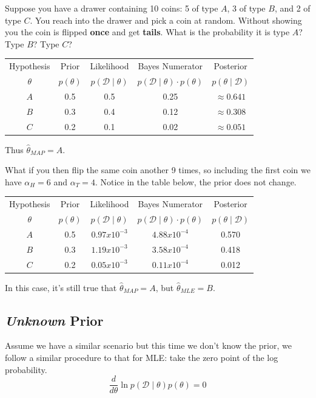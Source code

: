Suppose you have a drawer containing 10 coins: 
5 of type $A$, 3 of type $B$, and 2 of type $C$. 
You reach into the drawer and pick a coin at random. 
Without showing you the coin is flipped \textbf{once} and get \textbf{tails}. 
What is the probability it is type $A$? Type $B$? Type $C$? 

\begin{center}
\begin{tabular}{|c||c|c|c|c|}
\hline
Hypothesis & Prior & Likelihood & Bayes Numerator & Posterior\\
$\theta$ & $p(\theta)$ & $p(\mathcal{D}\mid\theta)$ & $p(\mathcal{D}\mid\theta)\cdot p(\theta)$ & $p(\theta\mid\mathcal{D})$\\
\hline
\hline
$A$	& 0.5		& 0.5		& 0.25	& $\approx0.641$\\
$B$	& 0.3		& 0.4		& 0.12	& $\approx0.308$\\
$C$	& 0.2		& 0.1		& 0.02	& $\approx0.051$\\
\hline
\end{tabular}
\end{center}

Thus $\hat\theta_{MAP} = A$. 

What if you then flip the same coin another 9 times, so including the first coin we have 
$\alpha_H=6$ and $\alpha_T=4$.
Notice in the table below, the prior does not change. 

\begin{center}
\begin{tabular}{|c||c|c|c|c|}
\hline
Hypothesis & Prior & Likelihood & Bayes Numerator & Posterior\\
$\theta$ & $p(\theta)$ & $p(\mathcal{D}\mid\theta)$ & $p(\mathcal{D}\mid\theta)\cdot p(\theta)$ & $p(\theta\mid\mathcal{D})$\\
\hline
\hline
$A$	& 0.5		& $0.97x10^{-3}$ & $4.88x10^{-4}$	& 0.570\\
$B$	& 0.3		& $1.19x10^{-3}$ & $3.58x10^{-4}$	& 0.418\\
$C$	& 0.2		& $0.05x10^{-3}$ & $0.11x10^{-4}$	& 0.012\\
\hline
\end{tabular}
\end{center}

In this case, it's still true that $\hat\theta_{MAP} = A$,
but $\hat\theta_{MLE} = B$. 


\subsection{\textit{Unknown} Prior}
Assume we have a similar scenario but this time we don't know the prior, 
we follow a similar procedure to that for MLE: 
take the zero point of the log probability. 
\[\frac{d}{d\theta} \ln p(\mathcal{D}\mid\theta)p(\theta) = 0\]

